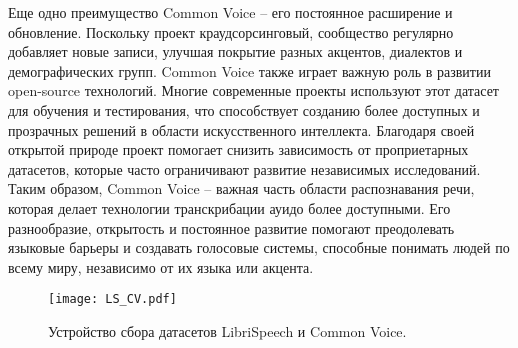 Еще одно преимущество Common Voice -- его постоянное расширение и обновление. Поскольку проект краудсорсинговый, сообщество регулярно добавляет новые записи, улучшая покрытие разных акцентов, диалектов и демографических групп.
Common Voice также играет важную роль в развитии open-source технологий.
Многие современные проекты используют этот датасет для обучения и тестирования, что способствует созданию более доступных и прозрачных решений в области искусственного интеллекта.
Благодаря своей открытой природе проект помогает снизить зависимость от проприетарных датасетов, которые часто ограничивают развитие независимых исследований.
Таким образом, Common Voice -- важная часть области распознавания речи, которая делает технологии транскрибации ауидо более доступными.
Его разнообразие, открытость и постоянное развитие помогают преодолевать языковые барьеры и создавать голосовые системы, способные понимать людей по всему миру, независимо от их языка или акцента.

\begin{figure}[!t]
  \centering
  \texttt{[image: LS\_CV.pdf]}
  \caption{Устройство сбора датасетов LibriSpeech и Common Voice.}
  \label{fig:ls_cv}
\end{figure}

